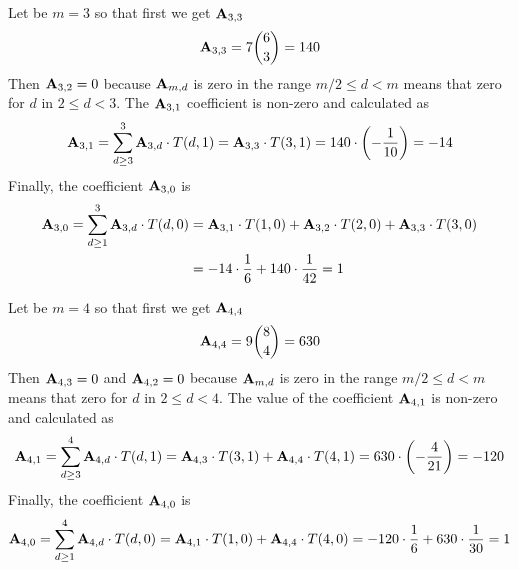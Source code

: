 \begin{example}
    Let be $m=3$ so that first we get ${\mathbf{A}} \sb{3,3}$
    \begin{equation*}
        {\mathbf{A}} \sb{3,3} = 7 \binom{6}{3}= 140
    \end{equation*}
    Then ${\mathbf{A}} \sb{3,2} = 0$ because ${\mathbf{A}} \sb{m,d}$ is zero in the range $m/2 \leq d < m$ means that zero for $d$
    in $2 \leq d < 3$.
    The ${\mathbf{A}} \sb{3,1}$ coefficient is non-zero and calculated as
    \begin{equation*}
        \begin{split}
            {\mathbf{A}} \sb{3,1} = \sum_{d \geq 3}^{3} {\mathbf{A}} \sb{3,d} \cdot T(d,1) = {\mathbf{A}} \sb{3,3} \cdot T(3,1)
            = 140 \cdot \left( -\frac{1}{10} \right) = -14
        \end{split}
    \end{equation*}
    Finally, the coefficient ${\mathbf{A}} \sb{3,0}$ is
    \begin{equation*}
        \begin{split}
            {\mathbf{A}} \sb{3,0}= \sum_{d \geq 1}^{3} {\mathbf{A}} \sb{3,d} \cdot T(d,0)
            &= {\mathbf{A}} \sb{3,1} \cdot T(1,0) + {\mathbf{A}} \sb{3,2} \cdot T(2,0) + {\mathbf{A}} \sb{3,3} \cdot T(3,0) \\
            &= -14 \cdot \frac{1}{6} + 140 \cdot \frac{1}{42} = 1
        \end{split}
    \end{equation*}
\end{example}
\begin{example}
    Let be $m=4$ so that first we get ${\mathbf{A}} \sb{4,4}$
    \begin{equation*}
        {\mathbf{A}} \sb{4,4} = 9 \binom{8}{4}= 630
    \end{equation*}
    Then ${\mathbf{A}} \sb{4,3} = 0$ and ${\mathbf{A}} \sb{4,2} = 0$
    because ${\mathbf{A}} \sb{m,d}$ is zero in the range $m/2 \leq d < m$ means that zero for $d$ in $2 \leq d < 4$.
    The value of the coefficient ${\mathbf{A}} \sb{4,1}$ is non-zero and calculated as
    \begin{equation*}
        \begin{split}
            {\mathbf{A}} \sb{4,1}
            = \sum_{d \geq 3}^{4} {\mathbf{A}} \sb{4,d} \cdot T(d,1)
            = {\mathbf{A}} \sb{4,3} \cdot T(3,1) + {\mathbf{A}} \sb{4,4} \cdot T(4,1)
            = 630 \cdot \left( -\frac{4}{21} \right)
            = -120
        \end{split}
    \end{equation*}
    Finally, the coefficient ${\mathbf{A}} \sb{4,0}$ is
    \begin{equation*}
        \begin{split}
            {\mathbf{A}} \sb{4,0}
            = \sum_{d \geq 1}^{4} {\mathbf{A}} \sb{4,d} \cdot T(d, 0)
            = {\mathbf{A}} \sb{4,1} \cdot T(1, 0) + {\mathbf{A}} \sb{4,4} \cdot T(4, 0)
            = -120 \cdot \frac{1}{6} + 630 \cdot \frac{1}{30} = 1
        \end{split}
    \end{equation*}
\end{example}
